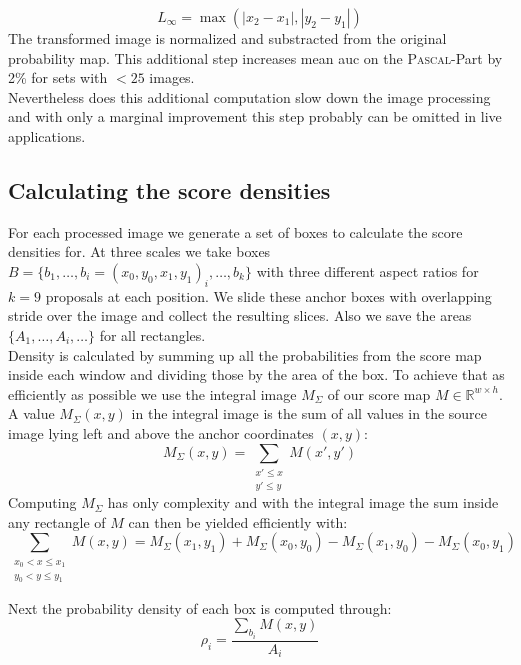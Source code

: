 \begin{equation}
    L_\infty = \max(|x_2 - x_1|, |y_2 - y_1|)
\end{equation}
The transformed image is normalized and substracted from the original probability map. This additional step increases mean \gls{auc} on the \textsc{Pascal}-Part by 2\% for sets with $< 25$ images.\\
Nevertheless does this additional computation slow down the image processing and with only a marginal improvement this step probably can be omitted in live applications.

\clearpage
\subsection{Calculating the score densities}
\label{sec:pipeline:eval:density}
For each processed image we generate a set of boxes to calculate the score densities for. At three scales we take boxes $B = \{b_1,\dotsc, b_i = (x_0, y_0, x_1, y_1)_i,\dotsc, b_k\}$ with three different aspect ratios for $k=9$ \citep{ren_faster_2015} proposals at each position. We slide these anchor boxes  with overlapping stride over the image and collect the resulting slices. Also we save the areas $\{A_1,\dotsc, A_i,\dotsc\}$ for all rectangles.\\
Density is calculated by summing up all the probabilities from the score map inside each window and dividing those by the area of the box. To achieve that as efficiently as possible we use the integral image $M_\Sigma$ of our score map $M\in \mathbb{R}^{w\times h}$. A value $M_\Sigma(x,y)$ in the integral image is the sum of all values in the source image lying left and above the anchor coordinates $(x,y)$:
\begin{equation}
    M_\Sigma(x, y) = \sum_{\substack{x' \le x\\ y' \le y}} M(x', y')
\end{equation}
Computing $M_\Sigma$ has only  complexity and with the integral image the sum inside any rectangle of $M$ can then be yielded efficiently with:
\begin{equation}
    \sum_{\substack{x_0 < x \le x_1\\ y_0 < y \le y_1}}M(x,y) = M_\Sigma(x_1, y_1) + M_\Sigma(x_0, y_0) - M_\Sigma(x_1, y_0) - M_\Sigma(x_0, y_1)
\end{equation}

Next the probability density of each box is computed through:
\begin{equation}
    \rho_i = \frac{\sum_{b_i}M(x,y)}{A_i}
\end{equation}

